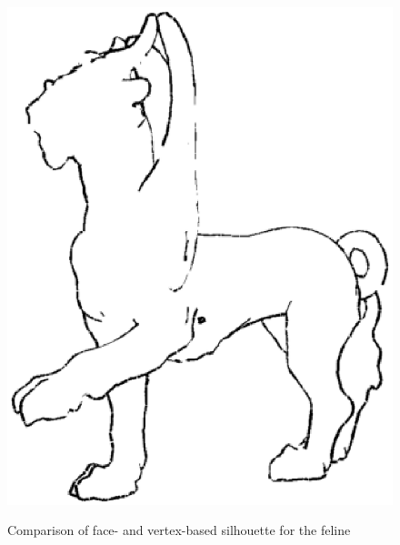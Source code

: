 \documentclass[a4paper,10pt,notitlepage]{scrreprt}
\begin{document}
\begin{figure}
{    \includegraphics[scale=0.4]{img-2-2/feline-vertex.eps}}
 \caption{Comparison of face- and vertex-based silhouette for the feline}
 \label{fig:silhouette-feline}
\end{figure}
\end{document}
